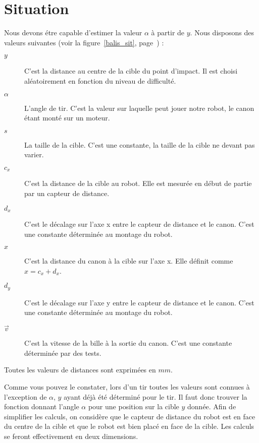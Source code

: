 \section{Situation}
Nous devons étre capable d'estimer la valeur $\alpha$ à partir de $y$. Nous disposons des valeurs suivantes (voir la figure~\ref{balis_sit}, page~\pageref{balis_sit}) :
\begin{description}
	\item[$y$] C'est la distance au centre de la cible du point d'impact. Il est choisi aléatoirement en fonction du niveau de difficulté.
	\item[$\alpha$] L'angle de tir. C'est la valeur sur laquelle peut jouer notre robot, le canon étant monté sur un moteur.
	\item[$s$] La taille de la cible. C'est une constante, la taille de la cible ne devant pas varier.
	\item[$c_x$] C'est la distance de la cible au robot. Elle est mesurée en début de partie par un capteur de distance.
	\item[$d_x$] C'est le décalage sur l'axe x entre le capteur de distance et le canon. C'est une constante déterminée au montage du robot.
	\item[$x$] C'est la distance du canon à la cible sur l'axe x. Elle définit comme $x=c_x+d_x$.
	\item[$d_y$] C'est le décalage sur l'axe y entre le capteur de distance et le canon. C'est une constante déterminée au montage du robot.
	\item[$\overrightarrow{v}$] C'est la vitesse de la bille à la sortie du canon. C'est une constante déterminée par des tests.
\end{description}
Toutes les valeurs de distances sont exprimées en $mm$.

Comme vous pouvez le constater, lors d'un tir toutes les valeurs sont connues à l'exception de $\alpha$, $y$ ayant déjà été déterminé pour le tir. Il faut donc trouver la fonction donnant l'angle $\alpha$ pour une position sur la cible $y$ donnée. Afin de simplifier les calculs, on considère que le capteur de distance du robot est en face du centre de la cible et que le robot est bien placé en face de la cible. Les calculs se feront effectivement en deux dimensions.

